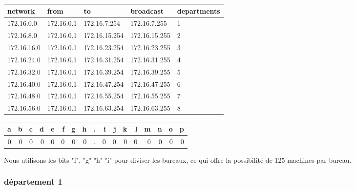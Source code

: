 \documentclass[11pt]{article}
\begin{document}
\begin{center}
\begin{tabular}{|l|l|l|l|l|}
\hline
network & from & to & broadcast & departments \\
\hline
172.16.0.0 & 172.16.0.1 & 172.16.7.254 & 172.16.7.255 & 1 \\
\hline
172.16.8.0 & 172.16.0.1 & 172.16.15.254 & 172.16.15.255 & 2 \\
\hline
172.16.16.0 & 172.16.0.1 & 172.16.23.254 & 172.16.23.255 & 3 \\
\hline
172.16.24.0 & 172.16.0.1 & 172.16.31.254 & 172.16.31.255 & 4 \\
\hline
172.16.32.0 & 172.16.0.1 & 172.16.39.254 & 172.16.39.255 & 5 \\
\hline
172.16.40.0 & 172.16.0.1 & 172.16.47.254 & 172.16.47.255 & 6 \\
\hline
172.16.48.0 & 172.16.0.1 & 172.16.55.254 & 172.16.55.255 & 7 \\
\hline
172.16.56.0 & 172.16.0.1 & 172.16.63.254 & 172.16.63.255 & 8 \\
\hline
\end{tabular}
\end{center}




\begin{center}
\begin{tabular}{rrrrrrrrlrrrrrrrr}
a & b & c & d & e & f & g & h & . & i & j & k & l & m & n & o & p\\
\hline
0 & 0 & 0 & 0 & 0 & 0 & 0 & 0 & . & 0 & 0 & 0 & 0 & 0 & 0 & 0 & 0\\
\end{tabular}
\end{center}


Nous utilisons les bits "f", "g" "h" "i" pour diviser les bureaux, ce qui
offre la possibilité de 125 machines par bureau.



\subsubsection{département 1}
\label{sec:orgheadline5}
\end{document}
